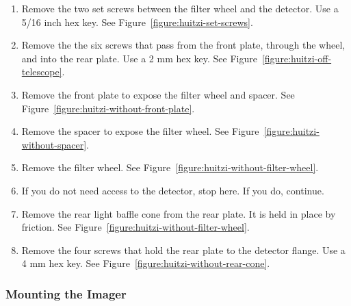 \begin{enumerate}
    \item Remove the two set screws between the filter wheel and the detector. Use a 5/16 inch hex key. See Figure~\ref{figure:huitzi-set-screws}.
    
    \item Remove the the six screws that pass from the front plate, through the wheel, and into the rear plate. Use a 2 mm hex key. See Figure~\ref{figure:huitzi-off-telescope}.
    
    \item Remove the front plate to expose the filter wheel and spacer. See Figure~\ref{figure:huitzi-without-front-plate}.
    
    \item Remove the spacer to expose the filter wheel. See Figure~\ref{figure:huitzi-without-spacer}.
    
    \item Remove the filter wheel. See Figure~\ref{figure:huitzi-without-filter-wheel}.
    
    \item If you do not need access to the detector, stop here. If you do, continue.
    
    \item Remove the rear light baffle cone from the rear plate. It is held in place by friction.  See Figure~\ref{figure:huitzi-without-filter-wheel}. 
    
    \item Remove the four screws that hold the rear plate to the detector flange. Use a 4 mm hex key. See Figure~\ref{figure:huitzi-without-rear-cone}.

\end{enumerate}

\subsubsection{Mounting the Imager}

